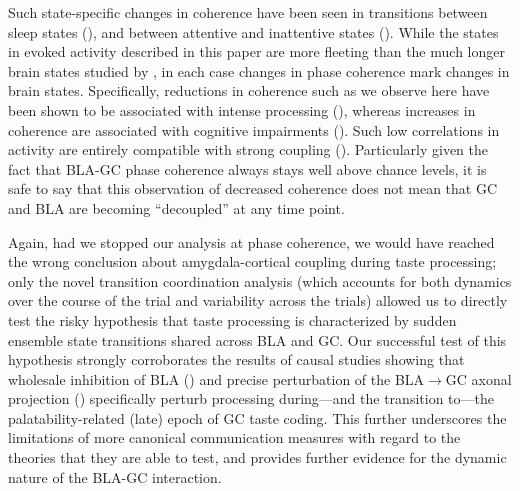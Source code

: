 \begin{refsection}
Such state-specific changes in coherence have been seen in transitions between sleep states (\cite{stitt2017a}), and between attentive and inattentive states (\cite{siegel2008a}). While the states in evoked activity described in this paper are more fleeting than the much longer brain states studied by \cite{stitt2017a,siegel2008a}, in each case changes in phase coherence mark changes in brain states. Specifically, reductions in coherence such as we observe here have been shown to be associated with intense processing (\cite{supp2011a}), whereas increases in coherence are associated with cognitive impairments (\cite{martinet2017a,arbab2018a}). Such low correlations in activity are entirely compatible with strong coupling (\cite{schneidman2006a}). Particularly given the fact that BLA-GC phase coherence always stays well above chance levels, it is safe to say that this observation of decreased coherence does not mean that GC and BLA are becoming “decoupled” at any time point. 

Again, had we stopped our analysis at phase coherence, we would have reached the wrong conclusion about amygdala-cortical coupling during taste processing; only the novel transition coordination analysis (which accounts for both dynamics over the course of the trial and variability across the trials) allowed us to directly test the risky hypothesis that taste processing is characterized by sudden ensemble state transitions shared across BLA and GC. Our successful test of this hypothesis strongly corroborates the results of causal studies showing that wholesale inhibition of BLA (\cite{piette2012a}) and precise perturbation of the BLA$\rightarrow$GC axonal projection (\cite{lin2021a}) specifically perturb processing during—and the transition to—the palatability-related (late) epoch of GC taste coding. This further underscores the limitations of more canonical communication measures with regard to the theories that they are able to test, and provides further evidence for the dynamic nature of the BLA-GC interaction.


\end{refsection}

